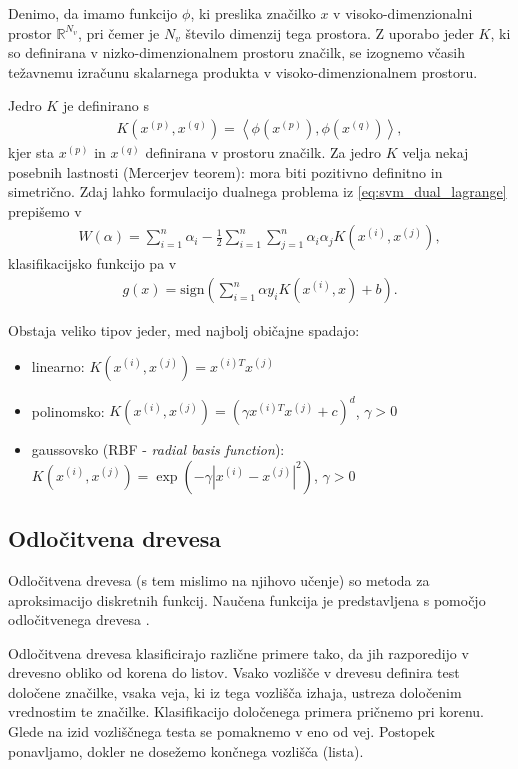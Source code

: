 \documentclass[11pt,a4paper,openany]{book}
\begin{document}
Denimo, da imamo funkcijo $\phi$, ki preslika značilko $x$ v visoko-dimenzionalni prostor $\mathbb{R}^{N_v}$, pri čemer je $N_v$ število dimenzij tega prostora. Z uporabo jeder $K$, ki so definirana v nizko-dimenzionalnem prostoru značilk, se izognemo včasih težavnemu izračunu skalarnega produkta v visoko-dimenzionalnem prostoru.

Jedro $K$ je definirano s
\begin{eqnarray}
	K(x^{(p)}, x^{(q)}) = \left<\phi(x^{(p)}), \phi(x^{(q)})\right>,
\end{eqnarray}
kjer sta $x^{(p)}$ in $x^{(q)}$ definirana v prostoru značilk. Za jedro $K$ velja nekaj posebnih lastnosti (Mercerjev teorem): mora biti pozitivno definitno in simetrično. Zdaj lahko formulacijo dualnega problema iz \ref{eq:svm_dual_lagrange} prepišemo v 
\begin{eqnarray}
	W(\alpha) = \sum^n_{i = 1}\alpha_i - \frac{1}{2} \sum^n_{i=1} \sum^n_{j=1} \alpha_i \alpha_j K(x^{(i)}, x^{(j)}),
\end{eqnarray}
klasifikacijsko funkcijo pa v
\begin{eqnarray}
	g(x) = \text{sign} \left(\sum^n_{i=1}\alpha y_i K(x^{(i)}, x) + b \right).
\end{eqnarray}

\noindent Obstaja veliko tipov jeder, med najbolj običajne spadajo:
\begin{itemize}
	\item linearno: $K(x^{(i)}, x^{(j)}) = x^{(i)T}x^{(j)}$
	\item polinomsko: $K(x^{(i)}, x^{(j)}) = (\gamma x^{(i)T}x^{(j)} + c)^d$, $\gamma > 0$ 
	\item gaussovsko (RBF - \textit{radial basis function}): $K(x^{(i)}, x^{(j)}) = \exp(-\gamma |x^{(i)}-x^{(j)}|^2)$, $\gamma > 0$ 
\end{itemize}

\subsection{Odločitvena drevesa}
\label{sc:decisiontrees}
Odločitvena drevesa (s tem mislimo na njihovo učenje) so metoda za aproksimacijo diskretnih funkcij. Naučena funkcija je predstavljena s pomočjo odločitvenega drevesa \cite{Mitchell1997}. 

Odločitvena drevesa klasificirajo različne primere tako, da jih razporedijo v drevesno obliko od korena do listov. Vsako vozlišče v drevesu definira test določene značilke, vsaka veja, ki iz tega vozlišča izhaja, ustreza določenim vrednostim te značilke. Klasifikacijo določenega primera pričnemo pri korenu. Glede na izid vozliščnega testa se pomaknemo v eno od vej. Postopek ponavljamo, dokler ne dosežemo končnega vozlišča (lista).
\end{document}

